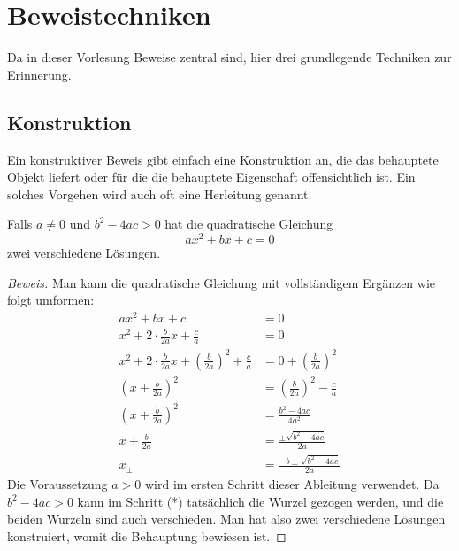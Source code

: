 %
%
%
\section{Beweistechniken}
Da in dieser Vorlesung Beweise zentral sind, hier drei grundlegende 
Techniken zur Erinnerung.

\subsection{Konstruktion}
%
Ein konstruktiver Beweis gibt einfach eine Konstruktion an, die
das behauptete Objekt liefert oder für die die behauptete Eigenschaft
offensichtlich ist.
Ein solches Vorgehen wird auch oft eine Herleitung genannt.

\begin{satz}
%
Falls $a\ne0$ und $b^2-4ac>0$ hat die quadratische Gleichung
\[
ax^2+bx+c=0
\]
zwei verschiedene Lösungen.
\end{satz}

\begin{proof}[Beweis]
Man kann die quadratische Gleichung mit vollständigem Ergänzen wie
folgt umformen:
{
\allowdisplaybreaks
\begin{align*}
ax^2+bx+c&=0\\
x^2+2\cdot \frac{b}{2a} x +\frac{c}a&=0\\
x^2+2\cdot \frac{b}{2a} x 
+\left(\frac{b}{2a}\right)^2
+\frac{c}a&=0
+\left(\frac{b}{2a}\right)^2\\
\left(x+\frac{b}{2a}\right)^2 &= \left(\frac{b}{2a}\right)^2 -\frac{c}a \\
\left(x+\frac{b}{2a}\right)^2 &=
\frac{b^2-4ac}{4a^2}\\
x+\frac{b}{2a}&=\frac{\pm\sqrt{b^2-4ac}}{2a}\tag{*}\\
x_{\pm}&=\frac{-b\pm\sqrt{b^2-4ac}}{2a}
\end{align*}
}
Die Voraussetzung $a>0$ wird im ersten Schritt dieser Ableitung verwendet.
Da $b^2-4ac>0$ kann im Schritt (*) tatsächlich die Wurzel gezogen werden,
und die beiden Wurzeln sind auch verschieden.
Man hat also zwei verschiedene
Lösungen konstruiert, womit die Behauptung bewiesen ist.
\end{proof}

